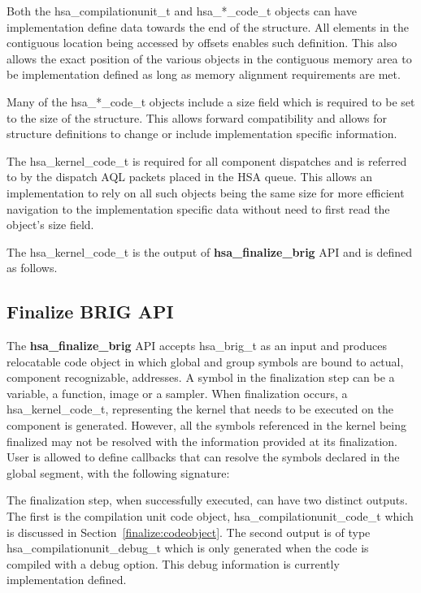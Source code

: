\documentclass{book}
\newcommand{\reffun}[1]{\textbf{#1}}
\newcommand{\reftyp}[1]{#1}
\begin{document}
\begin{appendices}
Both the \reftyp{hsa\_compilationunit\_t} and
\reftyp{hsa\_*\_code\_t} objects can have implementation define data
towards the end of the structure. All elements in the contiguous
location being accessed by offsets enables such definition.  This
also allows the exact position of the various objects in the
contiguous memory area to be implementation defined as long as
memory alignment requirements are met.

Many of the \reftyp{hsa\_*\_code\_t} objects include a size field
which is required to be set to the size of the structure. This
allows forward compatibility and allows for structure definitions to
change or include implementation specific information.

The \reftyp{hsa\_kernel\_code\_t} is required for all component
dispatches and is referred to by the dispatch AQL packets placed in
the HSA queue. This allows an implementation to rely on all such
objects being the same size for more efficient navigation to the
implementation specific data without need to first read the object's
size field.

The \reftyp{hsa\_kernel\_code\_t} is the output of
\reffun{hsa\_finalize\_brig} API and is defined as follows.



\subsection{Finalize BRIG API}
The \reffun{hsa\_finalize\_brig} API accepts \reftyp{hsa\_brig\_t} as
an input and produces relocatable code object in which global and
group symbols are bound to actual, component recognizable,
addresses.  A symbol in the finalization step can be a variable, a
function, image or a sampler. When finalization occurs, a
\reftyp{hsa\_kernel\_code\_t}, representing the kernel that needs to
be executed on the component is generated.  However, all the symbols
referenced in the kernel being finalized may not be resolved with
the information provided at its finalization. User is allowed to
define callbacks that can resolve the symbols declared in the global
segment, with the following signature:


The finalization step, when successfully executed, can have two
distinct outputs. The first is the compilation unit code object,
\reftyp{hsa\_compilationunit\_code\_t} which is discussed in
Section~\ref{finalize:codeobject}. The second output is of type
\reftyp{hsa\_compilationunit\_debug\_t} which is only generated when
the code is  compiled with a debug option. This debug information is
currently implementation defined.


\end{appendices}
\end{document}
